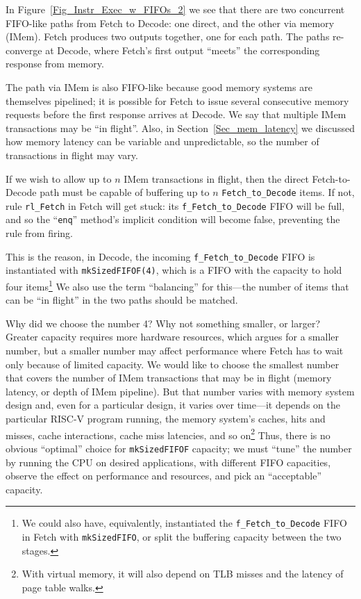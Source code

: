 \label{Sec_Balancing}


In Figure~\ref{Fig_Instr_Exec_w_FIFOs_2} we see that there are two
concurrent FIFO-like paths from Fetch to Decode: one direct, and the
other via memory (IMem).  Fetch produces two outputs together, one for
each path.  The paths re-converge at Decode, where Fetch's first
output ``meets'' the corresponding response from memory.


The path via IMem is also FIFO-like because good memory systems are
themselves pipelined; it is possible for Fetch to issue several
consecutive memory requests before the first response arrives at
Decode.  We say that multiple IMem transactions may be ``in flight''.
Also, in Section~\ref{Sec_mem_latency} we discussed how memory latency
can be variable and unpredictable, so the number of transactions in
flight may vary.

If we wish to allow up to $n$ IMem transactions in flight, then the
direct Fetch-to-Decode path must be capable of buffering up to $n$
\verb|Fetch_to_Decode| items.  If not, rule \verb|rl_Fetch| in Fetch
will get stuck: its \verb|f_Fetch_to_Decode| FIFO will be full, and so
the ``\verb|enq|'' method's implicit condition will become false,
preventing the rule from firing.

This is the reason, in Decode, the incoming \verb|f_Fetch_to_Decode|
FIFO is instantiated with \verb|mkSizedFIFOF(4)|, which is a FIFO with
the capacity to hold four items\footnote{We could also have,
equivalently, instantiated the {\tt f\_Fetch\_to\_Decode} FIFO in
Fetch with {\tt mkSizedFIFO}, or split the buffering capacity between
the two stages.}  We also use the term ``balancing'' for this---the
number of items that can be ``in flight'' in the two paths should be
matched.

Why did we choose the number 4?  Why not something smaller, or larger?
Greater capacity requires more hardware resources, which argues for a
smaller number, but a smaller number may affect performance where
Fetch has to wait only because of limited capacity.  We would like to
choose the smallest number that covers the number of IMem transactions
that may be in flight (memory latency, or depth of IMem pipeline).
But that number varies with memory system design and, even for a
particular design, it varies over time---it depends on the particular
RISC-V program running, the memory system's caches, hits and misses,
cache interactions, cache miss latencies, and so on\footnote{With
virtual memory, it will also depend on TLB misses and the latency of
page table walks.}  Thus, there is no obvious ``optimal'' choice for
\verb|mkSizedFIFOF| capacity; we must ``tune'' the number by running
the CPU on desired applications, with different FIFO capacities,
observe the effect on performance and resources, and pick an
``acceptable'' capacity.

